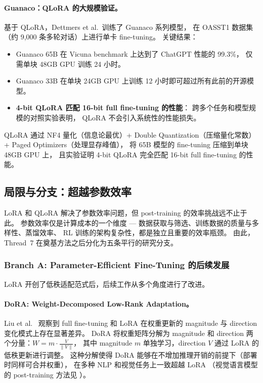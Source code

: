 \paragraph{Guanaco：QLoRA 的大规模验证。}
基于 QLoRA，Dettmers et al.\ 训练了 Guanaco 系列模型，
在 OASST1 数据集（约 9,000 条多轮对话）上进行单卡 fine-tuning。
关键结果：
\begin{itemize}[leftmargin=2em]
  \item Guanaco 65B 在 Vicuna benchmark 上达到了 ChatGPT 性能的 99.3\%，
    仅需单块 48GB GPU 训练 24 小时。
  \item Guanaco 33B 在单块 24GB GPU 上训练 12 小时即可超过所有此前的开源模型。
  \item \textbf{4-bit QLoRA 匹配 16-bit full fine-tuning 的性能}：
    跨多个任务和模型规模的对照实验表明，
    QLoRA 不会引入系统性的性能损失。
\end{itemize}

\begin{solutionbox}
QLoRA 通过 NF4 量化（信息论最优）+ Double Quantization（压缩量化常数）
+ Paged Optimizers（处理显存峰值），
将 65B 模型的 fine-tuning 压缩到单块 48GB GPU 上，
且实验证明 4-bit QLoRA 完全匹配 16-bit full fine-tuning 的性能。
\end{solutionbox}

\subsection{局限与分支：超越参数效率}
\label{sec:t7-branches}

LoRA 和 QLoRA 解决了参数效率问题，但 post-training 的效率挑战远不止于此。
参数效率仅是计算成本的一个维度 ---
数据获取与筛选、训练数据的质量与多样性、蒸馏效率、
RL 训练的架构复杂性，都是独立且重要的效率瓶颈。
由此，Thread~7 在奠基方法之后分化为五条平行的研究分支。

\subsubsection{Branch A: Parameter-Efficient Fine-Tuning 的后续发展}
\label{sec:t7-peft}

LoRA 开创了低秩适配范式后，后续工作从多个角度进行了改进。

\paragraph{DoRA: Weight-Decomposed Low-Rank Adaptation。}
Liu et al.\ \cite{liu2024dora} 观察到 full fine-tuning 和 LoRA 在权重更新的
magnitude 与 direction 变化模式上存在显著差异。
DoRA 将权重矩阵分解为 magnitude 和 direction 两个分量：$W = m \cdot \frac{V}{\|V\|}$，
其中 magnitude $m$ 单独学习，direction $V$ 通过 LoRA 的低秩更新进行调整。
这种分解使得 DoRA 能够在不增加推理开销的前提下（部署时同样可合并权重），
在多种 NLP 和视觉任务上一致超越 LoRA
（视觉语言模型的 post-training 方法见 ）。

